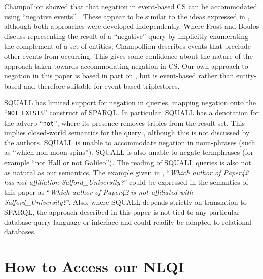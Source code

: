 \documentclass[../main.tex]{subfiles}
\begin{document}
\begin{refsection}
Champollion showed that that negation in event-based CS can be accommodated using ``negative events'' \cite{champollion2011}.  These appear to be similar to the ideas expressed in \cite{frostboulos2002}, although both approaches were developed independently.
Where Frost and Boulos discuss representing the result of a ``negative'' query by implicitly enumerating the complement of a set of entities, Champollion describes events that preclude other events from occurring.  This gives some confidence about the nature of the approach taken towards accommodating negation in CS. Our own approach to negation in this paper is based in part on \cite{frostboulos2002}, but is event-based rather than entity-based and therefore suitable for event-based triplestores.


SQUALL \cite{ferre:squall} has limited support for negation in queries, mapping negation onto the ``\texttt{NOT EXISTS}'' construct of SPARQL.  In particular, SQUALL has a denotation for the adverb ``\texttt{not}'', where its presence removes triples from the result set.  This implies closed-world semantics for the query \cite{dazari2014bridging}, although this is not discussed by the authors.  SQUALL is unable to accommodate negation in noun-phrases (such as ``which non-moon spins'').  SQUALL is also unable to negate termphrases (for example ``not Hall or not Galileo'').  The reading of SQUALL queries is also not as natural as our semantics.  The example given in \cite{ferre2014squall}, ``\textit{Which author of Paper42 has not affiliation Salford\_University?}'' could be expressed in the semantics of this paper as ``\textit{Which author of Paper42 is not affiliated with Salford\_University?}''.  Also, where SQUALL depends strictly on translation to SPARQL, the approach described in this paper is not tied to any particular database query language or interface and could readily be adapted to relational databases.


\section{How to Access our NLQI}
\label{webist2020conf:demo}


\end{refsection}
\end{document}
